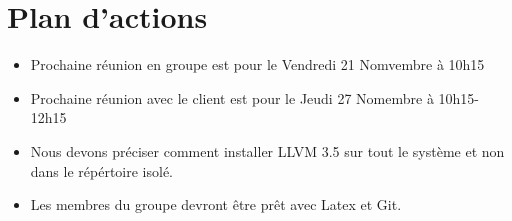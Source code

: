 \documentclass{../../../../../res/rapport}
\begin{document}
    \section{Plan d'actions} 
    \label{sec:plan_d_actions}
        \begin{itemize}
            \item Prochaine réunion en groupe est pour le Vendredi 21 Nomvembre
                   à 10h15
            \item Prochaine réunion avec le client est pour le Jeudi 27 Nomembre
                  à 10h15-12h15 
            \item Nous devons préciser comment installer LLVM 3.5 sur tout le 
                  système et non dans le répértoire isolé.
            \item Les membres du groupe devront être prêt avec Latex et Git.
        \end{itemize}
        
        
\end{document}
